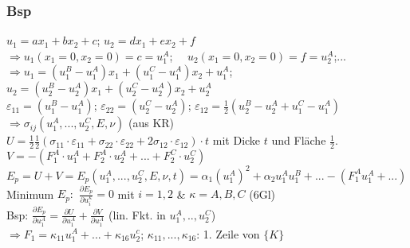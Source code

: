         \subsubsection{Bsp}
            $u_1=ax_1+bx_2+c$; $u_2=dx_1+ex_2+f$\\
            $\Rightarrow u_1(x_1=0,x_2=0)=c=u_1^A$; $\quad u_2(x_1=0,x_2=0)=f=u_2^A$;...\\
            $\Rightarrow u_1=(u_1^B-u_1^A)x_1+(u_1^C-u_1^A)x_2+u_1^A$;\\
            \small$u_2=(u_2^B-u_2^A)x_1+(u_2^C-u_2^A)x_2+u_2^A$\normalsize\\
            $\varepsilon_{11}=(u_1^B-u_1^A)$; $\varepsilon_{22}=(u_2^C-u_2^A)$; $\varepsilon_{12}=\frac{1}{2}(u_2^B-u_2^A+u_1^C-u_1^A)$
            $\Rightarrow\sigma_{ij}(u_1^A,...,u_2^C,E,\nu)$ (aus KR)\\
            $U=\frac{1}{2}\frac{1}{2}(\sigma_{11}\cdot\varepsilon_{11}+\sigma_{22}\cdot\varepsilon_{22}+2\sigma_{12}\cdot\varepsilon_{12})\cdot t$ mit Dicke $t$ und Fläche $\frac{1}{2}$.\\
            $V=-(F_1^A\cdot u_1^A+F_2^A\cdot u_2^A+...+F_2^C\cdot u_2^C)$\\
            $E_p=U+V=E_p(u_1^A,...,u_2^C,E,\nu,t)=\alpha_1(u_1^A)^2+\alpha_2u_1^Au_1^B+ ...-(F_1^Au_1^A+...)$\\
            Minimum $E_p:$ $\frac{\partial E_p}{\partial u_i^\kappa}=0$ mit $i=1,2$ \& $\kappa=A,B,C$ (6Gl)\\
            Bsp: $\frac{\partial E_p}{\partial u_1^A}=\frac{\partial U}{\partial u_1^A}+\frac{\partial V}{\partial u_1^A}$ (lin. Fkt. in $u_1^A,..,u_2^C$) \\$\Rightarrow F_1=\kappa_{11}u_1^A+...+\kappa_{16}u_2^c$; $\kappa_{11},...,\kappa_{16}$: 1. Zeile von $\{K\}$
